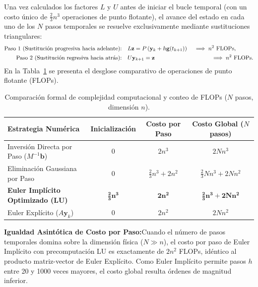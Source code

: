 \documentclass[11pt,a4paper]{article}
\newcommand{\takeaway}[2]{%
  \vspace{5pt}\noindent\colorbox{cyanaccent!8}{%
    \parbox{\dimexpr\linewidth-2\fboxsep\relax}{%
      \vspace{4pt}\textbf{\color{navy}#1:}\hspace{0.5em}#2\vspace{4pt}%
    }%
  }\vspace{5pt}%
}
\begin{document}
Una vez calculados los factores $L$ y $U$ antes de iniciar el bucle temporal (con un costo único de $\frac{2}{3}n^3$ operaciones de punto flotante), el avance del estado en cada uno de los $N$ pasos temporales se resuelve exclusivamente mediante sustituciones triangulares:
\begin{align}
    \text{Paso 1 (Sustitución progresiva hacia adelante):} \quad & L \mathbf{z} = P \left( \mathbf{y}_k + h\mathbf{g}(t_{k+1}) \right) \quad \implies n^2 \text{ FLOPs}, \\
    \text{Paso 2 (Sustitución regresiva hacia atrás):} \quad & U \mathbf{y}_{k+1} = \mathbf{z} \hspace{3.4cm} \implies n^2 \text{ FLOPs}.
\end{align}
En la Tabla~\ref{tab:complejidad_flops} se presenta el desglose comparativo de operaciones de punto flotante (FLOPs).

\begin{table}[!htbp]
    \centering
    \caption{Comparación formal de complejidad computacional y conteo de FLOPs ($N$ pasos, dimensión $n$).}
    {\small
    \begin{tabularx}{\linewidth}{>{\raggedright\arraybackslash}Xccc}
        \toprule
        \textbf{Estrategia Numérica} & \textbf{Inicialización} & \textbf{Costo por Paso} & \textbf{Costo Global ($N$ pasos)} \\
        \midrule
        Inversión Directa por Paso ($M^{-1}\mathbf{b}$) & $0$ & $2n^3$ & $2 N n^3$ \\
        Eliminación Gaussiana por Paso & $0$ & $\frac{2}{3}n^3 + 2n^2$ & $\frac{2}{3} N n^3 + 2 N n^2$ \\
        \textbf{Euler Implícito Optimizado (LU)} & $\mathbf{\frac{2}{3}n^3}$ & $\mathbf{2n^2}$ & $\mathbf{\frac{2}{3}n^3 + 2 N n^2}$ \\
        Euler Explícito ($A\mathbf{y}_k$) & $0$ & $2n^2$ & $2 N n^2$ \\
        \bottomrule
    \end{tabularx}
    }
    \label{tab:complejidad_flops}
\end{table}

\takeaway{Igualdad Asintótica de Costo por Paso}{Cuando el número de pasos temporales domina sobre la dimensión física ($N \gg n$), el costo por paso de Euler Implícito con precomputación LU es exactamente de $2n^2$ FLOPs, idéntico al producto matriz-vector de Euler Explícito. Como Euler Implícito permite pasos $h$ entre 20 y 1000 veces mayores, el costo global resulta órdenes de magnitud inferior.}
\end{document}

